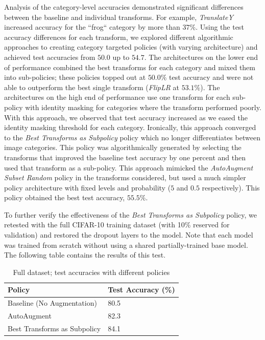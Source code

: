 \documentclass[10pt,twocolumn,letterpaper]{article}
\begin{document}
		Analysis of the category-level accuracies demonstrated significant differences between the baseline and individual transforms. For example, \textit{TranslateY} increased accuracy for the ``frog`` category by more than $37\%$. Using the test accuracy differences for each transform, we explored different algorithmic approaches to creating category targeted policies (with varying architecture) and achieved test accuracies from $50.0$ up to $54.7$. The architectures on the lower end of performance combined the best transforms for each category and mixed them into sub-policies; these policies topped out at $50.0\%$ test accuracy and were not able to outperform the best single transform (\textit{FlipLR} at $53.1\%$). The architectures on the high end of performance use one transform for each sub-policy with identity masking for categories where the transform performed poorly. With this approach, we observed that test accuracy increased as we eased the identity masking threshold for each category. Ironically, this approach converged to the \textit{Best Transforms as Subpolicy} policy which no longer differentiates between image categories. This policy was algorithmically generated by selecting the transforms that improved the baseline test accuracy by one percent and then used that transform as a sub-policy. This approach mimicked the \textit{AutoAugment Subset Random} policy in the transforms considered, but used a much simpler policy architecture with fixed levels and probability ($5$ and $0.5$ respectively). This policy obtained the best test accuracy, $55.5\%$. 
		
	
		To further verify the effectiveness of the \textit{Best Transforms as Subpolicy} policy, we retested with the full CIFAR-10 training dataset (with 10\% reserved for validation) and restored the dropout layers to the model. Note that each model was trained from scratch without using a shared partially-trained base model. The following table contains the results of this test.
		
		\begin{table}[h]
			\begin{tabular}{l|l}
				\hline
				Policy  						&Test Accuracy (\%)   \\ \hline
				Baseline (No Augmentation)  	&80.5 \\
				AutoAugment 					&82.3 \\ 
				Best Transforms as Subpolicy	&84.1 \\	

			\end{tabular}
			\caption{Full dataset; test accuracies with different policies}
		\end{table}
\end{document}
